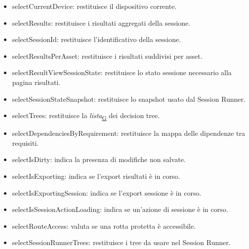 \documentclass[a4paper,12pt]{article}
\begin{document}
                    \begin{itemize}
                        \item {\ttfamily selectCurrentDevice}: restituisce il dispositivo corrente.
                        \item {\ttfamily selectResults}: restituisce i risultati aggregati della sessione.
                        \item {\ttfamily selectSessionId}: restituisce l'identificativo della sessione.
                        \item {\ttfamily selectResultsPerAsset}: restituisce i risultati suddivisi per asset.
                        \item {\ttfamily selectResultViewSessionState}: restituisce lo stato sessione necessario alla pagina risultati.
                        \item {\ttfamily selectSessionStateSnapshot}: restituisce lo snapshot usato dal Session Runner.
                        \item {\ttfamily selectTrees}: restituisce la \textit{lista}\textsubscript{\href{https://atlasteam9.github.io/Atlas/glossario.html\#Lista}{G}} dei decision tree.
                        \item {\ttfamily selectDependenciesByRequirement}: restituisce la mappa delle dipendenze tra requisiti.
                        \item {\ttfamily selectIsDirty}: indica la presenza di modifiche non salvate.
                        \item {\ttfamily selectIsExporting}: indica se l'export risultati è in corso.
                        \item {\ttfamily selectIsExportingSession}: indica se l'export sessione è in corso.
                        \item {\ttfamily selectIsSessionActionLoading}: indica se un'azione di sessione è in corso.
                        \item {\ttfamily selectRouteAccess}: valuta se una rotta protetta è accessibile.
                        \item {\ttfamily selectSessionRunnerTrees}: restituisce i tree da usare nel Session Runner.
                    \end{itemize}
\end{document}
